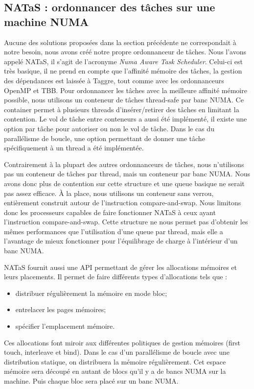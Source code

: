\subsection{NATaS : ordonnancer des tâches sur une machine NUMA}
Aucune des solutions proposées dans la section précédente ne correspondait à notre besoin, nous avons créé notre propre ordonnanceur de tâches.
%
Nous l'avons appelé NATaS, il s'agit de l'acronyme {\em Numa Aware Task Scheduler}.
%
Celui-ci est très basique, il ne prend en compte que l'affinité mémoire des tâches, la gestion des dépendances est laissée à Taggre, tout comme avec les ordonnanceurs OpenMP et TBB.
%
Pour ordonnancer les tâches avec la meilleure affinité mémoire possible, nous utilisons un conteneur de tâches thread-safe par banc NUMA.
%
Ce container permet à plusieurs threads d'insérer/retirer des tâches en limitant la contention.
%
Le vol de tâche entre conteneurs a aussi été implémenté, il existe une option par tâche pour autoriser ou non le vol de tâche.
%
Dans le cas du parallélisme de boucle, une option permettant de donner une tâche spécifiquement à un thread a été implémentée.

Contrairement à la plupart des autres ordonnanceurs de tâches, nous n'utilisons pas un conteneur de tâches par thread, mais un conteneur par banc NUMA.
%
Nous avons donc plus de contention sur cette structure et une queue basique ne serait pas assez efficace.
%
\`A la place, nous utilisons un conteneur sans verrou, entièrement construit autour de l'instruction compare-and-swap.
%
Nous limitons donc les processeurs capables de faire fonctionner NATaS à ceux ayant l'instruction compare-and-swap.
%
Cette structure ne nous permet pas d'obtenir les mêmes performances que l'utilisation d'une queue par thread, mais elle a l'avantage de mieux fonctionner pour l'équilibrage de charge à l'intérieur d'un banc NUMA.



NATaS fournit aussi une API permettant de gérer les allocations mémoires et leurs placements.
%
Il permet de faire différents types d'allocations tels que :
\begin{itemize}
  \item distribuer régulièrement la mémoire en mode bloc;
  \item entrelacer les pages mémoires;
  \item spécifier l'emplacement mémoire.
\end{itemize}
%
Ces allocations font miroir aux différentes politiques de gestion mémoires (first touch, interleave et bind).
%
Dans le cas d'un parallélisme de boucle avec une distribution statique, on distribuera la mémoire régulièrement.
%
Cet espace mémoire sera découpé en autant de blocs qu'il y a de bancs NUMA sur la machine.
%
Puis chaque bloc sera placé sur un banc NUMA.


